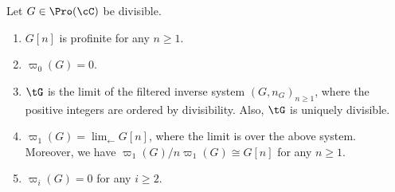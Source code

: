 \begin{lemm}\label{lem:divisible}
Let $G \in \Pro(\cC)$ be divisible.
\begin{enumerate}\romanenumi
\item \label{3.4.1} $G[n]$ is profinite for any $n \geq 1$.
\item \label{3.4.2} $\varpi_0(G) = 0$.
\item \label{3.4.3} $\tG$ is the limit of the filtered inverse system $(G,n_G)_{n \geq 1}$, where the positive integers are ordered by divisibility. Also, $\tG$ is uniquely divisible.
\item \label{3.4.4} $\varpi_1(G) = \lim_{\leftarrow} G[n]$, where the limit is over the above system. Moreover, we have $\varpi_1(G)/n \varpi_1(G) \cong G[n]$ for any $n \geq 1$.
\item \label{3.4.5} $\varpi_i(G) = 0$ for any $i \geq 2$.
\end{enumerate}
\end{lemm}

